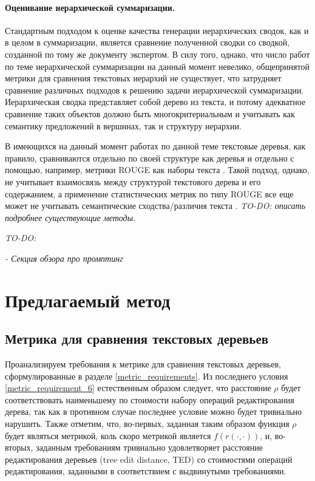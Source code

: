 \documentclass[12pt]{article}
\begin{document}
\paragraph{Оценивание иерархической суммаризации.} Стандартным подходом к оценке качества генерации иерархических сводок, как и в целом в суммаризации, является сравнение полученной сводки со сводкой, созданной по тому же документу экспертом. В силу того, однако, что число работ по теме иерархической суммаризации на данный момент невелико, общепринятой метрики для сравнения текстовых иерархий не существует, что затрудняет сравнение различных подходов к решению задачи иерархической суммаризации. Иерархическая сводка представляет собой дерево из текста, и потому адекватное сравнение таких объектов должно быть многокритериальным и учитывать как семантику предложений в вершинах, так и структуру иерархии. 

В имеющихся на данный момент работах по данной теме текстовые деревья, как правило, сравниваются отдельно по своей структуре как деревья и отдельно с помощью, например, метрики ROUGE \cite{lin2004rouge} как наборы текста \cite{wei2019revealing, zhang2024coreference}. Такой подход, однако, не учитывает взаимосвязь между структурой текстового дерева и его содержанием, а применение статистических метрик по типу ROUGE все еще может не учитывать семантические сходства/различия текста \cite{fabbri2021summeval}. \textit{TO-DO: описать подробнее существующие методы.} 

\textit{TO-DO:}

\textit{- Секция обзора про промптинг}

\newpage
\section{Предлагаемый метод}

\subsection{Метрика для сравнения текстовых деревьев}

Проанализируем требования к метрике для сравнения текстовых деревьев, сформулированные в разделе \ref{metric_requirements}. Из последнего условия \eqref{metric_requirement_6} естественным образом следует, что расстояние $\rho$ будет соответствовать наименьшему по стоимости набору операций редактирования дерева, так как в противном случае последнее условие можно будет тривиально нарушить. Также отметим, что, во-первых, заданная таким образом функция $\rho$ будет являться метрикой, коль скоро метрикой является $f\left(r(\cdot, \cdot)\right)$, и, во-вторых, заданным требованиям тривиально удовлетворяет расстояние редактирования деревьев (tree edit distance, TED) со стоимостями операций редактирования, заданными в соответствием с выдвинутыми требованиями.
\end{document}
